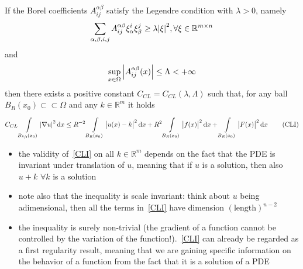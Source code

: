 \begin{thm}
	If the Borel coefficients \(A_{ij}^{\alpha \beta}\) satisfy the Legendre condition with \(\lambda>0\), namely
	\begin{gather}
		\sum_{\alpha,\beta,i,j} A_{ij}^{\alpha\beta} \xi_{\alpha}^{i} \xi_{\beta}^{j} \geq \lambda \abs{\xi}^{2}, \forall \xi \in \mathbb{R}^{m \times n}
	\end{gather}
	and
	\begin{gather}
		\sup_{x \in \Omega} \abs{A_{ij}^{\alpha\beta}(x)} \leq \Lambda < + \infty
	\end{gather}
	then there exists a positive constant \(C_{CL} = C_{CL}(\lambda, \Lambda)\) such that, for any ball \(B_{R}(x_{0})\subset \subset \Omega \) and any \(k \in \mathbb{R}^{m}\) it holds
	\begin{gather}
		C_{CL}\int\limits_{B_{\sfrac{R}{2}}(x_{0})}^{} \abs{\nabla u}^{2} \dd{x} \leq R^{-2}\int\limits_{B_{R}(x_{0})}^{} \abs{u(x)-k}^{2} \dd{x} + R^{2}\int\limits_{B_{R}(x_{0})} \abs{f(x)}^{2} \dd{x} +  \int\limits_{B_{R}(x_{0})} \abs{F(x)}^{2} \dd{x} \tag{CLI}\label{CLI}
	\end{gather}
\end{thm}
\begin{remark}
	\begin{itemize}
		\item the validity of~\eqref{CLI} on all \(k \in \mathbb{R}^{m}\) depends on the fact that the PDE is invariant under translation of \(u\), meaning that if \(u\) is a solution, then also \(u+k\) \(\forall k\) is a solution
		\item note also that the inequality is scale invariant: think about \(u\) being adimensional, then all the terms in~\eqref{CLI} have dimension \({(\text{length})}^{n-2}\)
		\item the inequality is surely non-trivial (the gradient of a function cannot be controlled by the variation of the function!).~\eqref{CLI} can already be regarded as a first regularity result, meaning that we are gaining specific information on the behavior of a function from the fact that it is a solution of a PDE
	\end{itemize}
\end{remark}
